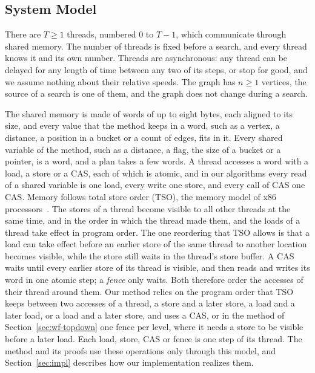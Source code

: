 \subsection{System Model}
\label{sec:bg-model}

There are $T \geq 1$ threads, numbered $0$ to $T-1$, which communicate through shared memory. The number of threads is fixed before a search, and every thread knows it and its own number. Threads are asynchronous: any thread can be delayed for any length of time between any two of its steps, or stop for good, and we assume nothing about their relative speeds. The graph has $n \geq 1$ vertices, the source of a search is one of them, and the graph does not change during a search.

The shared memory is made of words of up to eight bytes, each aligned to its size, and every value that the method keeps in a word, such as a vertex, a distance, a position in a bucket or a count of edges, fits in it. Every shared variable of the method, such as a distance, a flag, the size of a bucket or a pointer, is a word, and a plan takes a few words. A thread accesses a word with a load, a store or a CAS, each of which is atomic, and in our algorithms every read of a shared variable is one load, every write one store, and every call of \textsc{CAS} one CAS. Memory follows total store order (TSO), the memory model of x86 processors~\cite{x86tso, intelmanual, amdmanual}. The stores of a thread become visible to all other threads at the same time, and in the order in which the thread made them, and the loads of a thread take effect in program order. The one reordering that TSO allows is that a load can take effect before an earlier store of the same thread to another location becomes visible, while the store still waits in the thread's store buffer. A CAS waits until every earlier store of its thread is visible, and then reads and writes its word in one atomic step; a \emph{fence} only waits. Both therefore order the accesses of their thread around them. Our method relies on the program order that TSO keeps between two accesses of a thread, a store and a later store, a load and a later load, or a load and a later store, and uses a CAS, or in the method of Section~\ref{sec:wf-topdown} one fence per level, where it needs a store to be visible before a later load. Each load, store, CAS or fence is one step of its thread. The method and its proofs use these operations only through this model, and Section~\ref{sec:impl} describes how our implementation realizes them.

